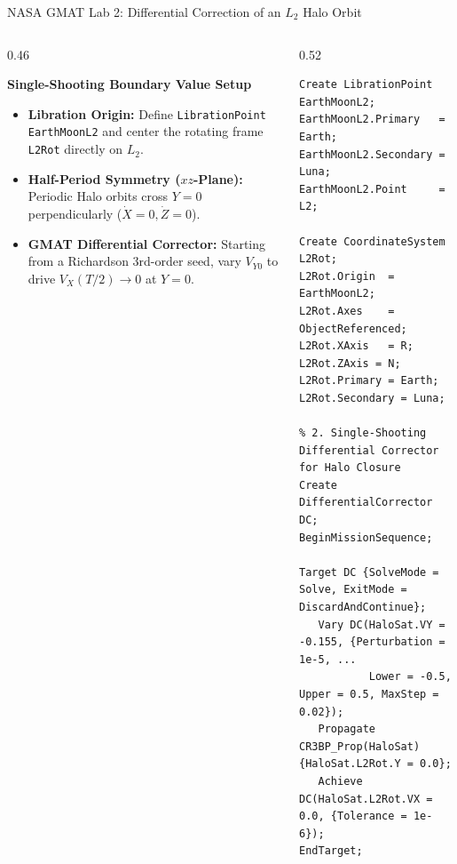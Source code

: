 \documentclass[aspectratio=169, 10pt]{beamer}
\begin{document}
\begin{frame}[fragile]{NASA GMAT Lab 2: Differential Correction of an $L_2$ Halo Orbit}
    \begin{columns}[t]
        \begin{column}{0.46\textwidth}
            \begin{block}{\textbf{Single-Shooting Boundary Value Setup}}
                \scriptsize
                \begin{itemize}\setlength{\itemsep}{2pt}
                    \item \textbf{Libration Origin:} Define \texttt{LibrationPoint EarthMoonL2} and center the rotating frame \texttt{L2Rot} directly on $L_2$.
                    \item \textbf{Half-Period Symmetry ($xz$-Plane):} Periodic Halo orbits cross $Y = 0$ perpendicularly ($\dot{X} = 0, \dot{Z} = 0$).
                    \item \textbf{GMAT Differential Corrector:} Starting from a Richardson 3rd-order seed, vary $V_{Y0}$ to drive $V_X(T/2) \to 0$ at $Y = 0$.
                \end{itemize}
            \end{block}
        \end{column}
        
        \begin{column}{0.52\textwidth}
\begin{lstlisting}[style=gmatstyle]
% 1. Define L2 Libration Point & Local Rotating Frame
Create LibrationPoint EarthMoonL2;
EarthMoonL2.Primary   = Earth;
EarthMoonL2.Secondary = Luna;
EarthMoonL2.Point     = L2;

Create CoordinateSystem L2Rot;
L2Rot.Origin  = EarthMoonL2;
L2Rot.Axes    = ObjectReferenced;
L2Rot.XAxis   = R;   L2Rot.ZAxis = N;
L2Rot.Primary = Earth; L2Rot.Secondary = Luna;

% 2. Single-Shooting Differential Corrector for Halo Closure
Create DifferentialCorrector DC;
BeginMissionSequence;

Target DC {SolveMode = Solve, ExitMode = DiscardAndContinue};
   Vary DC(HaloSat.VY = -0.155, {Perturbation = 1e-5, ...
           Lower = -0.5, Upper = 0.5, MaxStep = 0.02});
   Propagate CR3BP_Prop(HaloSat) {HaloSat.L2Rot.Y = 0.0};
   Achieve DC(HaloSat.L2Rot.VX = 0.0, {Tolerance = 1e-6});
EndTarget;
\end{lstlisting}
        \end{column}
    \end{columns}
\end{frame}
\end{document}
